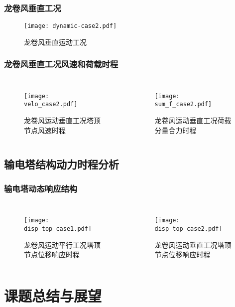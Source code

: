 \begin{frame}
  \frametitle{龙卷风垂直工况}
  \begin{figure}[!htpb]
    \centering
    \texttt{[image: dynamic-case2.pdf]}
    \caption*{龙卷风垂直运动工况}
    \label{fig:dynamic-case2}
  \end{figure}
\end{frame}

\begin{frame}
  \frametitle{龙卷风垂直工况风速和荷载时程}
  \begin{columns}
   \begin{figure}[!htpb]
     \centering
     \texttt{[image: velo\_case2.pdf]}
     \caption*{龙卷风运动垂直工况塔顶节点风速时程}
     \label{fig:velo_case2}
   \end{figure}
   \begin{figure}[!htpb]
     \centering
     \texttt{[image: sum\_f\_case2.pdf]}
     \caption*{龙卷风运动垂直工况荷载分量合力时程}
     \label{fig:sum_f_case2}
   \end{figure}
  \end{columns}
\end{frame}

\subsection{输电塔结构动力时程分析}

\begin{frame}
  \frametitle{输电塔动态响应结构}
  \begin{columns}
   \begin{figure}[!htpb]
     \centering
     \texttt{[image: disp\_top\_case1.pdf]}
     \caption*{龙卷风运动平行工况塔顶节点位移响应时程}
     \label{fig:disp_top_case1}
   \end{figure}
   \begin{figure}[!htpb]
     \centering
     \texttt{[image: disp\_top\_case2.pdf]}
     \caption*{龙卷风运动垂直工况塔顶节点位移响应时程}
     \label{fig:disp_top_case2}
   \end{figure}
  \end{columns}
\end{frame}

\section{课题总结与展望}

